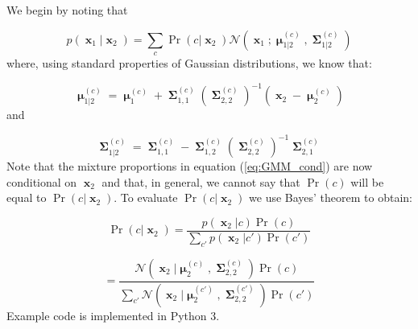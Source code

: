 \documentclass[a4paper, 11pt]{article}
\DeclareMathOperator{\x}{\boldsymbol{x}}
\DeclareMathOperator{\bmu}{\boldsymbol{\mu}}
\DeclareMathOperator{\bSigma}{\boldsymbol{\Sigma}}
\begin{document}
We begin by noting that

\begin{equation}
	p(\x_1| \x_2) = \sum_c \Pr(c| \x_2) \mathcal{N}\left(
		\x_1; \bmu_{1|2}^{(c)}, \bSigma_{1|2}^{(c)}
	\right)
    \label{eq:GMM_cond}
\end{equation}
where, using standard properties of Gaussian distributions, we know that:

\begin{equation}
	\bmu_{1|2}^{(c)} = \bmu_{1}^{(c)} + \bSigma_{1,1}^{(c)} \left(\bSigma^{(c)}_{2,2}\right)^{-1} (\x_2 - \bmu_2^{(c)})
\end{equation}
and

\begin{equation}
	\bSigma_{1|2}^{(c)} = \bSigma_{1,1}^{(c)} - \bSigma_{1,2}^{(c)} \left(\bSigma^{(c)}_{2,2}\right)^{-1} \bSigma^{(c)}_{2,1}
\end{equation}
Note that the mixture proportions in equation (\ref{eq:GMM_cond}) are now conditional on $\x_2$ and that, in general, we cannot say that $\Pr(c)$ will be equal to $\Pr(c | \x_2)$. To evaluate $\Pr(c | \x_2)$ we use Bayes' theorem to obtain:

\begin{equation}
    \Pr(c | \x_2) = \frac{p(\x_2 | c) \Pr(c)}{\sum_{c'} p(\x_2 | c') \Pr(c')}
\end{equation}

\begin{equation}
    = \frac{ \mathcal{N}(\x_2 | \bmu_2^{(c)}, \bSigma_{2,2}^{(c)}) \Pr(c)}{\sum_{c'} \mathcal{N}(\x_2 | \bmu_2^{(c')}, \bSigma_{2,2}^{(c')}) \Pr(c')}
\end{equation}
Example code is implemented in Python 3. 
\end{document}
